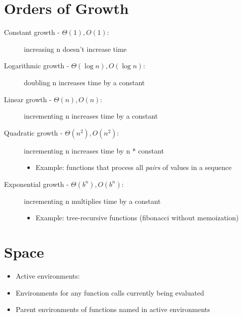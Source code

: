 \section{Orders of Growth}
\begin{description}
    \item [Constant growth - $\Theta(1), O(1)$:] increasing n doesn't increase time
    \item [Logarithmic growth - $\Theta(\log n), O(\log n)$:] doubling n increases time by a constant
    \item [Linear growth - $\Theta(n), O(n)$:] incrementing n increases time by a constant
    \item [Quadratic growth - $\Theta(n^2), O(n^2)$:] incrementing n increases time by n * constant
    \begin{itemize}
        \item Example: functions that process all \emph{pairs} of values in a sequence
    \end{itemize}
    \item [Exponential growth - $\Theta(b^n), O(b^n)$:] incrementing n multiplies time by a constant
    \begin{itemize}
        \item Example: tree-recursive functions (fibonacci without memoization)
    \end{itemize}
\end{description}

\section{Space}
\begin{itemize}
    \item Active environments: 
    \item Environments for any function calls currently being evaluated
    \item Parent environments of functions named in active environments
\end{itemize}
